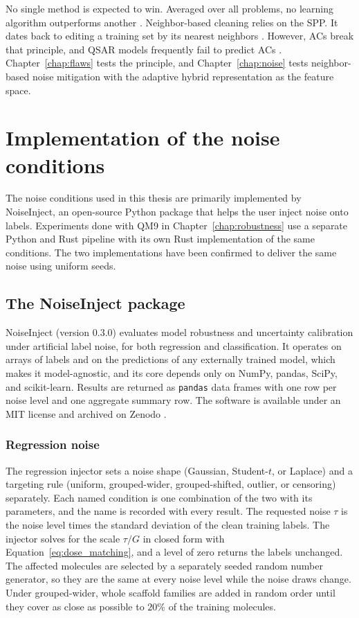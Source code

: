 No single method is expected to win. Averaged over all problems, no learning algorithm outperforms another \citep{Wolpert1996}. Neighbor-based cleaning relies on the SPP. It dates back to editing a training set by its nearest neighbors \citep{Wilson1972}. However, ACs break that principle, and QSAR models frequently fail to predict ACs \citep{Dablander2023}. Chapter~\ref{chap:flaws} tests the principle, and Chapter~\ref{chap:noise} tests neighbor-based noise mitigation with the adaptive hybrid representation as the feature space.

\section{Implementation of the noise conditions}

The noise conditions used in this thesis are primarily implemented by NoiseInject, an open-source Python package that helps the user inject noise onto labels. Experiments done with QM9 in Chapter~\ref{chap:robustness} use a separate Python and Rust pipeline with its own Rust implementation of the same conditions. The two implementations have been confirmed to deliver the same noise using uniform seeds. 

\subsection{The NoiseInject package}\label{sec:noiseinject_pkg}

NoiseInject (version 0.3.0) evaluates model robustness and uncertainty calibration under artificial
label noise, for both regression and classification. It operates on arrays of labels and on the
predictions of any externally trained model, which makes it model-agnostic, and its core depends only
on NumPy, pandas, SciPy, and scikit-learn. Results are returned as \texttt{pandas} data frames with one
row per noise level and one aggregate summary row. The software is available under an MIT license
and archived on Zenodo \citep{noiseinject}.

\subsubsection{Regression noise}
The regression injector sets a noise shape (Gaussian, Student-$t$, or
Laplace) and a targeting rule (uniform, grouped-wider, grouped-shifted, outlier, or censoring)
separately. Each named condition is one combination of the two with its parameters, and the name is recorded with every result.
The requested noise $\tau$ is the noise level times the standard deviation of the clean training labels. The
injector solves for the scale $\tau / G$ in closed
form with Equation~\ref{eq:dose_matching}, and a level of zero returns the
labels unchanged. The affected molecules are selected by a separately seeded random number generator, so they are
the same at every noise level while the noise draws change. Under
grouped-wider, whole scaffold families are added in random order until they cover as close as possible
to $20\%$ of the training molecules.

